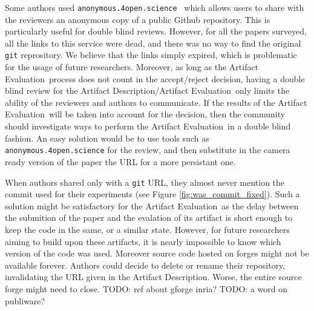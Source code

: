 \documentclass[sigconf,natbib=false]{acmart}
\newcommand{\ad}{Artifact Description}
\newcommand{\aeval}{Artifact Evaluation}
\newcommand{\adae}{\ad/\aeval}
\newcommand{\todo}[1]{{\color{red}TODO: #1}}
\begin{document}
Some authors used \texttt{anonymous.4open.science}\ \cite{anonymous_github} which allows users to share with the reviewers an anonymous copy of a public Github repository.
This is particularly useful for double blind reviews.
However, for all the papers surveyed, all the links to this service were dead, and there was no way to find the original \texttt{git} reprository.
We believe that the links simply expired, which is problematic for the usage of future researchers.
Moreover, as long as the \aeval\ process does not count in the accept/reject decision, having a double blind review for the \adae\ only limits the ability of the reviewers and authors to communicate.
If the results of the \aeval\ will be taken into account for the decision, then the community should investigate ways to perform the \aeval\ in a double blind fashion.
An easy solution would be to use tools such as \texttt{anonymous.4open.science} for the review, and then substitute in the camera ready version of the paper the URL for a more persistant one.

When authors shared only with a \texttt{git} URL, they almost never mention the commit used for their experiments (see Figure \ref{fig:was_commit_fixed}).
Such a solution might be satisfactory for the \aeval\ as the delay between the submition of the paper and the evalation of its artifact is short enough to keep the code in the same, or a similar state.
However, for future researchers aiming to build upon these artifacts, it is nearly impossible to know which version of the code was used.
Moreover source code hosted on forges might not be available forever.
Authors could decide to delete or rename their repository, invalidating the URL given in the \ad.
Worse, the entire source forge might need to close. \todo{ref about gforge inria?}
\todo{a word on publiware?}
\end{document}

